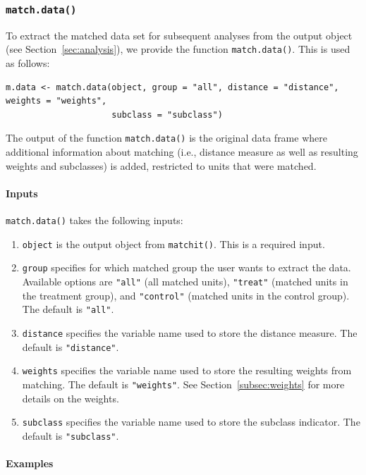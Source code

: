 \documentclass[oneside,letterpaper,titlepage]{article}
\begin{document}
\subsubsection{{\tt match.data()}}
\label{subsec:match.data}

To extract the matched data set for subsequent analyses from the
output object (see Section~\ref{sec:analysis}), we provide the
function {\tt match.data()}.  This is used as follows:
\begin{verbatim}
m.data <- match.data(object, group = "all", distance = "distance", weights = "weights",
                     subclass = "subclass")
\end{verbatim}
The output of the function {\tt match.data()} is the original data
frame where additional information about matching (i.e., distance
measure as well as resulting weights and subclasses) is added,
restricted to units that were matched.

\paragraph{Inputs}

{\tt match.data()} takes the following inputs:
\begin{enumerate}
\item {\tt object} is the output object from {\tt matchit()}. This is
  a required input.
\item {\tt group} specifies for which matched group the user wants to
  extract the data. Available options are {\tt "all"} (all matched
  units), {\tt "treat"} (matched units in the treatment group), and
  {\tt "control"} (matched units in the control group). The default is
  {\tt "all"}.
\item {\tt distance} specifies the variable name used to store the
  distance measure. The default is {\tt "distance"}.
\item {\tt weights} specifies the variable name used to store the
  resulting weights from matching. The default is {\tt "weights"}. See
  Section~\ref{subsec:weights} for more details on the weights.
\item {\tt subclass} specifies the variable name used to store the
  subclass indicator. The default is {\tt "subclass"}.
\end{enumerate}

\paragraph{Examples}
\end{document}
